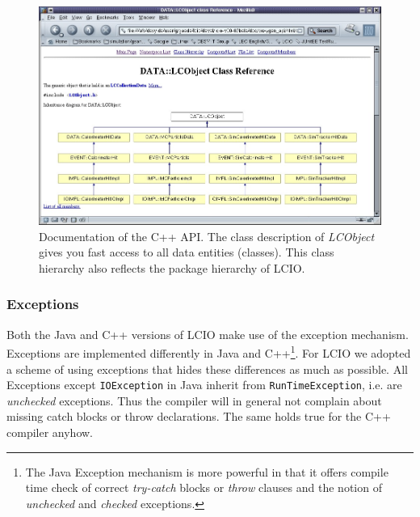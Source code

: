 \documentclass[twoside]{article}
\begin{document}
\begin{figure}
\includegraphics[width=145mm]{cpp_api}   
\caption{Documentation of the C++ API. The class description of {\em LCObject} gives you fast access 
to all data entities (classes). This class hierarchy also reflects the package hierarchy of LCIO.
\label{fig_cpp_api} 
}
\end{figure}


\subsubsection{Exceptions} \label{exceptions}
Both the Java and C++ versions of LCIO make use of the exception mechanism. Exceptions are 
implemented differently in Java and C++\footnote{The Java Exception mechanism is more powerful 
in that it offers compile time check of correct {\em try-catch} blocks or {\em throw} clauses 
and the notion of {\em unchecked} and {\em checked} exceptions.}. 
For LCIO we adopted a scheme of using exceptions that 
hides these differences as much as possible. All Exceptions except \verb$IOException$ in Java inherit 
from \verb$RunTimeException$, i.e. are {\em unchecked} exceptions. Thus the compiler will in general 
not complain about missing catch blocks or throw declarations. The same holds true for the C++ compiler 
anyhow.
\end{document}
